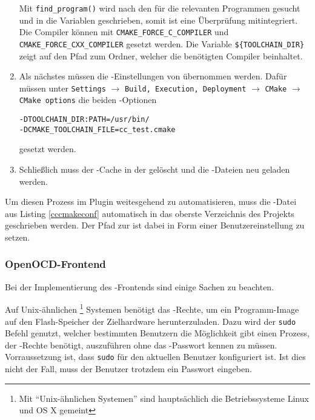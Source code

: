 \begin{enumerate}
            Mit \texttt{find\_program()} wird nach den für die  relevanten Programmen gesucht und
            in die Variablen geschrieben, somit ist eine Überprüfung mitintegriert. Die Compiler können mit
            \texttt{CMAKE\_FORCE\_C\_COMPILER} und \texttt{CMAKE\_FORCE\_CXX\_COMPILER} gesetzt werden. Die Variable
            \texttt{\$\{TOOLCHAIN\_DIR\}} zeigt auf den Pfad zum Ordner, welcher die benötigten Compiler beinhaltet.
            \item Als nächstes müssen die -Einstellungen von  übernommen werden. Dafür müssen unter
            \texttt{Settings} $\rightarrow$ \texttt{Build, Execution, Deployment} $\rightarrow$ \texttt{CMake}
             $\rightarrow$ \texttt{CMake options} die beiden -Optionen
            \begin{Verbatim}[frame=single]
-DTOOLCHAIN_DIR:PATH=/usr/bin/
-DCMAKE_TOOLCHAIN_FILE=cc_test.cmake
            \end{Verbatim}
            gesetzt werden.
            \item Schließlich muss der -Cache in der  gelöscht und die -Dateien neu geladen werden.
        \end{enumerate}

        Um diesen Prozess im Plugin weitesgehend zu automatisieren, muss die -Datei aus Listing \ref{cccmakeconf}
        automatisch in das oberste Verzeichnis des Projekts geschrieben werden. Der Pfad zur  ist
        dabei in Form einer Benutzereinstellung zu setzen.

        \subsubsection{OpenOCD-Frontend}
        Bei der Implementierung des -Frontends sind einige Sachen zu beachten.

        Auf Unix-ähnlichen
        \footnote{Mit ``Unix-ähnlichen Systemen'' sind hauptsächlich die Betriebssysteme Linux und OS X gemeint}
        Systemen benötigt das  -Rechte, um ein Programm-Image auf den Flash-Speicher der Zielhardware
        herunterzuladen. Dazu wird der \texttt{sudo} Befehl genutzt, welcher bestimmten Benutzern die Möglichkeit gibt
        einen Prozess, der -Rechte benötigt, auszuführen ohne das -Passwort kennen zu müssen.
        Vorraussetzung ist, dass \texttt{sudo} für den aktuellen Benutzer konfiguriert ist. Ist dies nicht der Fall,
        muss der Benutzer trotzdem ein Passwort eingeben.

